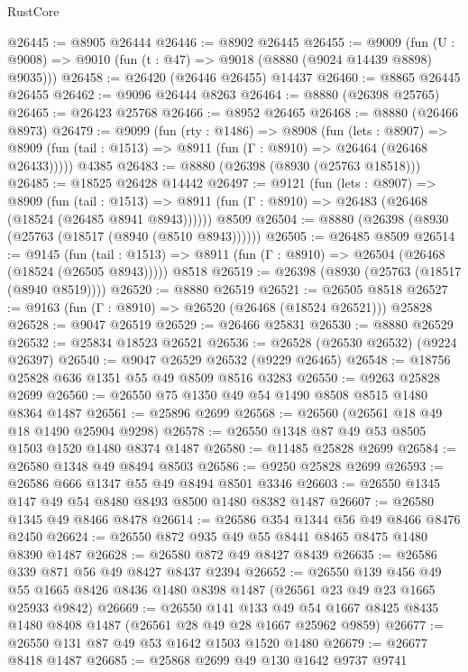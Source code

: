 \begin{lexlean}{RustCore}
\begin{coremodule}
@26445 := @8905 @26444
@26446 := @8902 @26445
@26455 := @9009
    (fun (U : @9008) => @9010 (fun (t : @47) => @9018 (@8880 (@9024 @14439 @8898) @9035)))
@26458 := @26420 (@26446 @26455) @14437
@26460 := @8865 @26445 @26455
@26462 := @9096 @26444 @8263
@26464 := @8880 (@26398 @25765)
@26465 := @26423 @25768
@26466 := @8952 @26465
@26468 := @8880 (@26466 @8973)
@26479 := @9099
    (fun (rty : @1486) =>
    @8908
      (fun (lets : @8907) =>
      @8909 (fun (tail : @1513) => @8911 (fun (Γ : @8910) => @26464 (@26468 @26433)))))
    @4385
@26483 := @8880 (@26398 (@8930 (@25763 @18518)))
@26485 := @18525 @26428 @14442
@26497 := @9121
    (fun (lets : @8907) =>
    @8909
      (fun (tail : @1513) =>
      @8911 (fun (Γ : @8910) => @26483 (@26468 (@18524 (@26485 @8941 @8943))))))
    @8509
@26504 := @8880 (@26398 (@8930 (@25763 (@18517 (@8940 (@8510 @8943))))))
@26505 := @26485 @8509
@26514 := @9145
    (fun (tail : @1513) => @8911 (fun (Γ : @8910) => @26504 (@26468 (@18524 (@26505 @8943)))))
    @8518
@26519 := @26398 (@8930 (@25763 (@18517 (@8940 @8519))))
@26520 := @8880 @26519
@26521 := @26505 @8518
@26527 := @9163 (fun (Γ : @8910) => @26520 (@26468 (@18524 @26521))) @25828
@26528 := @9047 @26519
@26529 := @26466 @25831
@26530 := @8880 @26529
@26532 := @25834 @18523 @26521
@26536 := @26528 (@26530 @26532) (@9224 @26397)
@26540 := @9047 @26529 @26532 (@9229 @26465)
@26548 := @18756 @25828 @636 @1351 @55 @49 @8509 @8516 @3283
@26550 := @9263 @25828 @2699
@26560 := @26550 @75 @1350 @49 @54 @1490 @8508 @8515 @1480 @8364 @1487
@26561 := @25896 @2699
@26568 := @26560 (@26561 @18 @49 @18 @1490 @25904 @9298)
@26578 := @26550 @1348 @87 @49 @53 @8505 @1503 @1520 @1480 @8374 @1487
@26580 := @11485 @25828 @2699
@26584 := @26580 @1348 @49 @8494 @8503
@26586 := @9250 @25828 @2699
@26593 := @26586 @666 @1347 @55 @49 @8494 @8501 @3346
@26603 := @26550 @1345 @147 @49 @54 @8480 @8493 @8500 @1480 @8382 @1487
@26607 := @26580 @1345 @49 @8466 @8478
@26614 := @26586 @354 @1344 @56 @49 @8466 @8476 @2450
@26624 := @26550 @872 @935 @49 @55 @8441 @8465 @8475 @1480 @8390 @1487
@26628 := @26580 @872 @49 @8427 @8439
@26635 := @26586 @339 @871 @56 @49 @8427 @8437 @2394
@26652 := @26550
    @139
    @456
    @49
    @55
    @1665
    @8426
    @8436
    @1480
    @8398
    @1487
    (@26561 @23 @49 @23 @1665 @25933 @9842)
@26669 := @26550
    @141
    @133
    @49
    @54
    @1667
    @8425
    @8435
    @1480
    @8408
    @1487
    (@26561 @28 @49 @28 @1667 @25962 @9859)
@26677 := @26550 @131 @87 @49 @53 @1642 @1503 @1520 @1480
@26679 := @26677 @8418 @1487
@26685 := @25868 @2699 @49 @130 @1642 @9737 @9741

\end{coremodule}
\end{lexlean}
